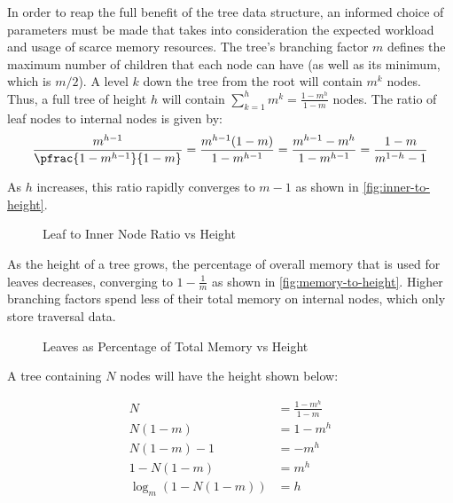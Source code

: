 \label{subsec:system-architecture}

\label{subsec:tree-parameters}


In order to reap the full benefit of the tree data structure, an informed choice
of parameters must be made that takes into consideration the expected workload
and usage of scarce memory resources.
%
The tree's branching factor $m$ defines the maximum number of children that each
node can have (as well as its minimum, which is $m/2$). A level $k$ down the
tree from the root will contain $m^k$ nodes. Thus, a full tree of height $h$
will contain $\sum_{k=1}^h m^k = \frac{1-m^h}{1-m}$ nodes.
%
The ratio of leaf nodes to internal nodes is given by:
$$
	\frac{m^{h-1}}{\pfrac{1-m^{h-1}}{1-m}}
	= \frac{m^{h-1}(1-m)}{1-m^{h-1}}
	= \frac{m^{h-1}-m^{h}}{1-m^{h-1}}
	= \frac{1-m}{m^{1-h} - 1}
$$

As $h$ increases, this ratio rapidly converges to $m-1$ as shown in
\autoref{fig:inner-to-height}.

\begin{figure}[H]
	\centering
	
	\caption{Leaf to Inner Node Ratio vs Height}
	\label{fig:inner-to-height}
\end{figure}

As the height of a tree grows, the percentage of overall memory that is used for
leaves decreases, converging to $1-\frac{1}{m}$ as shown in
\autoref{fig:memory-to-height}. Higher branching factors spend less of their
total memory on internal nodes, which only store traversal data.

\begin{figure}[H]
	\centering
	
	\caption{Leaves as Percentage of Total Memory vs Height}
	\label{fig:memory-to-height}
\end{figure}

A tree containing $N$ nodes will have the height shown below:

\begin{align*}
	N &= \frac{1-m^h}{1-m} \\
	N (1-m) &= 1-m^h \\
	N (1-m) - 1 &= -m^h \\
	1 - N (1-m) &= m^h \\
	\log_m\left(1 - N (1-m)\right) &= h
\end{align*}


